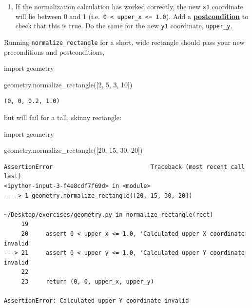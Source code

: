\documentclass[
]{krantz}
\makeatletter
\newenvironment{Shaded}{\begin{snugshade}}{\end{snugshade}}
\newcommand{\DecValTok}[1]{\textcolor[rgb]{0.00,0.00,0.81}{#1}}
\newcommand{\ImportTok}[1]{#1}
\newcommand{\NormalTok}[1]{#1}
\providecommand{\tightlist}{%
  \setlength{\itemsep}{0pt}\setlength{\parskip}{0pt}}
\newenvironment{kframe}{%
\medskip{}
\setlength{\fboxsep}{.8em}
 \def\at@end@of@kframe{}%
 \ifinner\ifhmode%
  \def\at@end@of@kframe{\end{minipage}}%
  \begin{minipage}{\columnwidth}%
 \fi\fi%
 \def\FrameCommand##1{\hskip\@totalleftmargin \hskip-\fboxsep
 \colorbox{shadecolor}{##1}\hskip-\fboxsep
     \hskip-\linewidth \hskip-\@totalleftmargin \hskip\columnwidth}%
 \MakeFramed {\advance\hsize-\width
   \@totalleftmargin\z@ \linewidth\hsize
   \@setminipage}}%
 {\par\unskip\endMakeFramed%
 \at@end@of@kframe}
\renewenvironment{Shaded}{\begin{kframe}}{\end{kframe}}
\newcommand{\gref}[2]{\hyperlink{#2}{\textbf{#1}}}
\makeatother
\begin{document}
\begin{enumerate}
\def\labelenumi{\arabic{enumi}.}
\setcounter{enumi}{1}
\tightlist
\item
  If the normalization calculation has worked correctly,
  the new \texttt{x1} coordinate will lie between 0 and 1 (i.e.~\texttt{0\ \textless{}\ upper\_x\ \textless{}=\ 1.0}).
  Add a \gref{postcondition}{postcondition} to check that this is true.
  Do the same for the new \texttt{y1} coordinate, \texttt{upper\_y}.
\end{enumerate}

Running \texttt{normalize\_rectangle} for a short, wide rectangle should pass your new
preconditions and postconditions,

\begin{Shaded}
\begin{Highlighting}[]
\ImportTok{import}\NormalTok{ geometry}

\NormalTok{geometry.normalize\_rectangle([}\DecValTok{2}\NormalTok{, }\DecValTok{5}\NormalTok{, }\DecValTok{3}\NormalTok{, }\DecValTok{10}\NormalTok{])                                                             }
\end{Highlighting}
\end{Shaded}

\begin{verbatim}
(0, 0, 0.2, 1.0)
\end{verbatim}

but will fail for a tall, skinny rectangle:

\begin{Shaded}
\begin{Highlighting}[]
\ImportTok{import}\NormalTok{ geometry}

\NormalTok{geometry.normalize\_rectangle([}\DecValTok{20}\NormalTok{, }\DecValTok{15}\NormalTok{, }\DecValTok{30}\NormalTok{, }\DecValTok{20}\NormalTok{])}
\end{Highlighting}
\end{Shaded}

\begin{verbatim}
AssertionError                            Traceback (most recent call last)
<ipython-input-3-f4e8cdf7f69d> in <module>
----> 1 geometry.normalize_rectangle([20, 15, 30, 20])

~/Desktop/exercises/geometry.py in normalize_rectangle(rect)
     19 
     20     assert 0 < upper_x <= 1.0, 'Calculated upper X coordinate invalid'
---> 21     assert 0 < upper_y <= 1.0, 'Calculated upper Y coordinate invalid'
     22 
     23     return (0, 0, upper_x, upper_y)

AssertionError: Calculated upper Y coordinate invalid
\end{verbatim}
\end{document}

